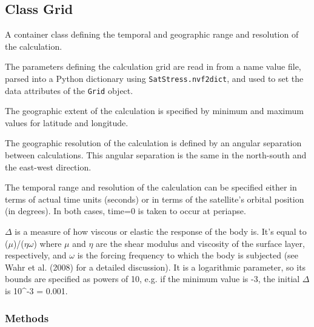 
\subsection{Class Grid}

    \label{satstress:GridCalc:Grid}
A container class defining the temporal and geographic range and resolution
of the calculation.

The parameters defining the calculation grid are read in from a name value 
file, parsed into a Python dictionary using \texttt{SatStress.nvf2dict}, 
and used to set the data attributes of the \texttt{Grid} object.

The geographic extent of the calculation is specified by minimum and 
maximum values for latitude and longitude.

The geographic resolution of the calculation is defined by an angular 
separation between calculations.  This angular separation is the same in 
the north-south and the east-west direction.

The temporal range and resolution of the calculation can be specified 
either in terms of actual time units (seconds) or in terms of the 
satellite's orbital position (in degrees).  In both cases, time=0 is taken 
to occur at periapse.

\(\Delta\) is a measure of how viscous or elastic the response of the body 
is.  It's equal to (\(\mu\))/(\(\eta\)\(\omega\)) where \(\mu\) and 
\(\eta\) are the shear modulus and viscosity of the surface layer, 
respectively, and \(\omega\) is the forcing frequency to which the body is 
subjected (see Wahr et al. (2008) for a detailed discussion).  It is a 
logarithmic parameter, so its bounds are specified as powers of 10, e.g. if
the minimum value is -3, the initial \(\Delta\) is 10{\textasciicircum}-3 =
0.001.



  \subsubsection{Methods}

